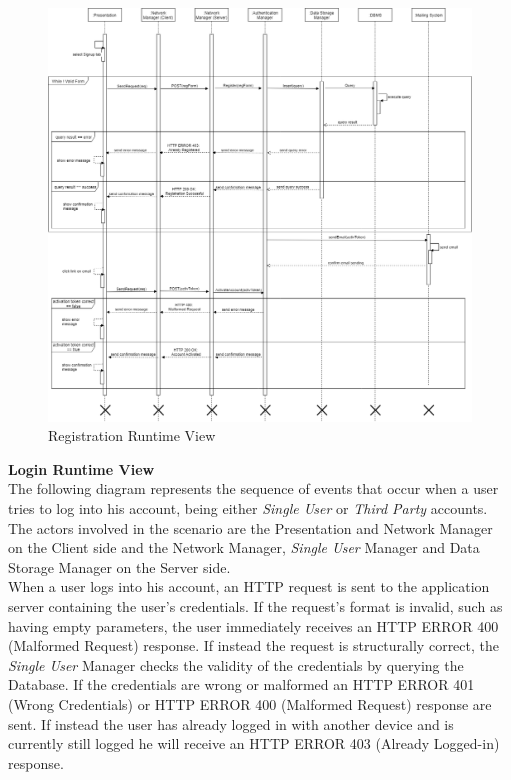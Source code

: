 \documentclass[titlepage]{article}
\begin{document}
\begin{figure}[H]
	\center
  	\includegraphics[width=15cm]{Registration.png}
  	\caption{Registration Runtime View}
 	\label{fig:REG}
\end{figure}
\noindent
{\bf Login Runtime View }\\ 
The following diagram represents the sequence of events that occur when a user tries to log into his account, being either {\it Single User} or {\it Third Party} accounts. The actors involved in the scenario are the Presentation and Network Manager on the Client side and the Network Manager, {\it Single User} Manager and Data Storage Manager on the Server side. \\
When a user logs into his account, an HTTP request is sent to the application server containing the user’s credentials. If the request’s format is invalid, such as having empty parameters, the user immediately receives an HTTP ERROR 400 (Malformed Request) response. If instead the request is structurally correct, the {\it Single User} Manager checks the validity of the credentials by querying the Database. If the credentials are wrong or malformed an HTTP ERROR 401 (Wrong Credentials) or HTTP ERROR 400 (Malformed Request) response are sent. If instead the user has already logged in with another device and is currently still logged he will receive an HTTP ERROR 403 (Already Logged-in) response.\\
\end{document}
